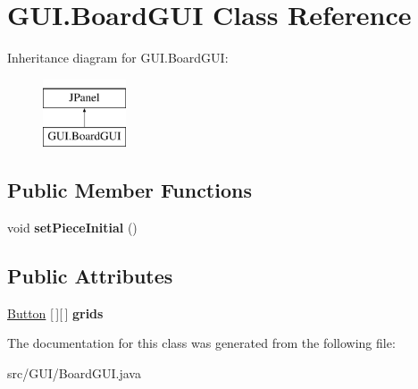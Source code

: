 \hypertarget{class_g_u_i_1_1_board_g_u_i}{}\section{G\+U\+I.\+Board\+G\+UI Class Reference}
\label{class_g_u_i_1_1_board_g_u_i}
Inheritance diagram for G\+U\+I.\+Board\+G\+UI\+:\begin{figure}[H]
\begin{center}
\leavevmode
\includegraphics[height=2.000000cm]{class_g_u_i_1_1_board_g_u_i}
\end{center}
\end{figure}
\subsection*{Public Member Functions}
\begin{DoxyCompactItemize}
\item 
\mbox{\label{class_g_u_i_1_1_board_g_u_i_a56dd455759059ad5efa9cfcc6d20cc90}} 
void {\bfseries set\+Piece\+Initial} ()
\end{DoxyCompactItemize}
\subsection*{Public Attributes}
\begin{DoxyCompactItemize}
\item 
\mbox{\label{class_g_u_i_1_1_board_g_u_i_a8ba06c3f4e942afd4e173c6d3919cd1b}} 
\mbox{\hyperlink{class_g_u_i_1_1_button}{Button}} \mbox{[}$\,$\mbox{]}\mbox{[}$\,$\mbox{]} {\bfseries grids}
\end{DoxyCompactItemize}


The documentation for this class was generated from the following file\+:\begin{DoxyCompactItemize}
\item 
src/\+G\+U\+I/Board\+G\+U\+I.\+java\end{DoxyCompactItemize}
